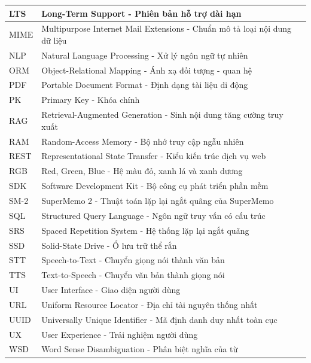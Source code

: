 \documentclass[../DoAn.tex]{subfiles}
\begin{document}
\begin{longtable}{|p{3cm}|p{11cm}|}
\hline
LTS & Long-Term Support - Phiên bản hỗ trợ dài hạn \\
\hline
MIME & Multipurpose Internet Mail Extensions - Chuẩn mô tả loại nội dung dữ liệu \\
\hline
NLP & Natural Language Processing - Xử lý ngôn ngữ tự nhiên \\
\hline
ORM & Object-Relational Mapping - Ánh xạ đối tượng - quan hệ \\
\hline
PDF & Portable Document Format - Định dạng tài liệu di động \\
\hline
PK & Primary Key - Khóa chính \\
\hline
RAG & Retrieval-Augmented Generation - Sinh nội dung tăng cường truy xuất \\
\hline
RAM & Random-Access Memory - Bộ nhớ truy cập ngẫu nhiên \\
\hline
REST & Representational State Transfer - Kiểu kiến trúc dịch vụ web \\
\hline
RGB & Red, Green, Blue - Hệ màu đỏ, xanh lá và xanh dương \\
\hline
SDK & Software Development Kit - Bộ công cụ phát triển phần mềm \\
\hline
SM-2 & SuperMemo 2 - Thuật toán lặp lại ngắt quãng của SuperMemo \\
\hline
SQL & Structured Query Language - Ngôn ngữ truy vấn có cấu trúc \\
\hline
SRS & Spaced Repetition System - Hệ thống lặp lại ngắt quãng \\
\hline
SSD & Solid-State Drive - Ổ lưu trữ thể rắn \\
\hline
STT & Speech-to-Text - Chuyển giọng nói thành văn bản \\
\hline
TTS & Text-to-Speech - Chuyển văn bản thành giọng nói \\
\hline
UI & User Interface - Giao diện người dùng \\
\hline
URL & Uniform Resource Locator - Địa chỉ tài nguyên thống nhất \\
\hline
UUID & Universally Unique Identifier - Mã định danh duy nhất toàn cục \\
\hline
UX & User Experience - Trải nghiệm người dùng \\
\hline
WSD & Word Sense Disambiguation - Phân biệt nghĩa của từ \\
\hline
\end{longtable}
\end{document}
